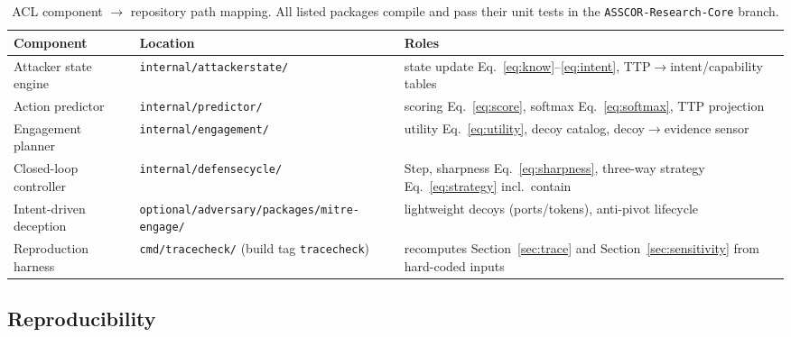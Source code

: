 \documentclass[preprints,article,accept,oneauthor]{Definitions/mdpi}
\begin{document}
\begin{table}[ht]
\centering
\begin{adjustbox}{max width=\linewidth}\begin{tabular}{@{}lll@{}}
\toprule
\textbf{Component} & \textbf{Location} & \textbf{Roles} \\
\midrule
Attacker state engine & \texttt{internal/attackerstate/} & state update
Eq.~\ref{eq:know}--\ref{eq:intent}, TTP$\to$intent/capability tables \\
Action predictor & \texttt{internal/predictor/} & scoring
Eq.~\ref{eq:score}, softmax Eq.~\ref{eq:softmax}, TTP projection \\
Engagement planner & \texttt{internal/engagement/} & utility
Eq.~\ref{eq:utility}, decoy catalog, decoy$\to$evidence sensor \\
Closed-loop controller & \texttt{internal/defensecycle/} & Step,
sharpness Eq.~\ref{eq:sharpness}, three-way strategy
Eq.~\ref{eq:strategy} incl.\ contain \\
Intent-driven deception & \texttt{optional/adversary/packages/mitre-engage/} &
lightweight decoys (ports/tokens), anti-pivot lifecycle \\
Reproduction harness & \texttt{cmd/tracecheck/} (build tag
\texttt{tracecheck}) & recomputes Section~\ref{sec:trace} and
Section~\ref{sec:sensitivity} from hard-coded inputs \\
\bottomrule
\end{tabular}\end{adjustbox}
\caption{ACL component $\to$ repository path mapping. All listed packages
compile and pass their unit tests in the \texttt{ASSCOR-Research-Core}
branch.}
\label{tab:repo-map}
\end{table}

\subsection{Reproducibility}
\end{document}
